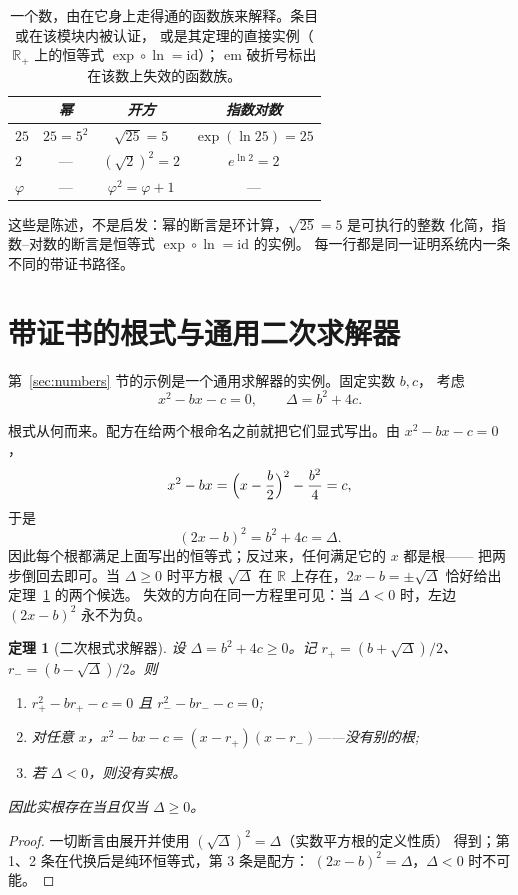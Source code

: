 \documentclass[submission,noinfoline]{jsfds}
\newtheorem{theorem}{定理}
\newcommand{\Lean}[1]{}
\begin{document}
\begin{table}[ht]
\centering
\begin{tabular}{lccc}
  & \emph{幂} & \emph{开方} & \emph{指数对数}\\
  \hline
  $25$ & $25=5^2$ & $\sqrt{25}=5$ & $\exp(\ln 25)=25$\\
  $2$ & --- & $(\sqrt2)^2=2$ & $e^{\ln 2}=2$\\
  $\varphi$ & --- & $\varphi^2=\varphi+1$ & ---\\
  \hline
\end{tabular}
\caption{一个数，由在它身上走得通的函数族来解释。条目或在该模块内被认证，
或是其定理的直接实例（$\mathbb R_+$ 上的恒等式 $\exp\circ\ln=\mathrm{id}$）；
em 破折号标出在该数上失效的函数族。}
\label{tab:exhibit}
\end{table}

这些是陈述，不是启发：幂的断言是环计算，$\sqrt{25}=5$ 是可执行的整数
化简，指数--对数的断言是恒等式 $\exp\circ\ln=\mathrm{id}$ 的实例。
每一行都是同一证明系统内一条不同的带证书路径。

\section{带证书的根式与通用二次求解器}\label{sec:computation}

第~\ref{sec:numbers} 节的示例是一个通用求解器的实例。固定实数 $b,c$，
考虑
\begin{equation}\label{eq:quad}
  x^2-bx-c=0,\qquad \Delta=b^2+4c .
\end{equation}

根式从何而来。配方在给两个根命名之前就把它们显式写出。由
$x^2-bx-c=0$，
\begin{equation*}
  x^2-bx=\Bigl(x-\frac b2\Bigr)^2-\frac{b^2}{4}=c,
\end{equation*}
于是
\begin{equation*}
  (2x-b)^2=b^2+4c=\Delta.
\end{equation*}
因此每个根都满足上面写出的恒等式；反过来，任何满足它的 $x$ 都是根——
把两步倒回去即可。当 $\Delta\ge0$ 时平方根 $\sqrt\Delta$ 在 $\mathbb R$
上存在，$2x-b=\pm\sqrt\Delta$ 恰好给出定理~\ref{thm:quad} 的两个候选。
失效的方向在同一方程里可见：当 $\Delta<0$ 时，左边 $(2x-b)^2$ 永不为负。

\begin{theorem}[二次根式求解器]\label{thm:quad}
设 $\Delta=b^2+4c\ge 0$。记
$r_+=(b+\sqrt\Delta)/2$、$r_-=(b-\sqrt\Delta)/2$。则
\begin{enumerate}
\item $r_+^2-br_+-c=0$ 且 $r_-^2-br_--c=0$;
\item 对任意 $x$，$x^2-bx-c=(x-r_+)(x-r_-)$——没有别的根;
\item 若 $\Delta<0$，则没有实根。
\end{enumerate}
因此实根存在当且仅当 $\Delta\ge 0$。
\end{theorem}
\begin{proof}
一切断言由展开并使用 $(\sqrt\Delta)^2=\Delta$（实数平方根的定义性质）
得到；第 1、2 条在代换后是纯环恒等式，第 3 条是配方：
$(2x-b)^2=\Delta$，$\Delta<0$ 时不可能。
\Lean{quadRootPlus\_sq, quadRootMinus\_sq, quadFactor, quad\_no\_roots,
quad\_solvable\_iff}
\end{proof}
\end{document}
